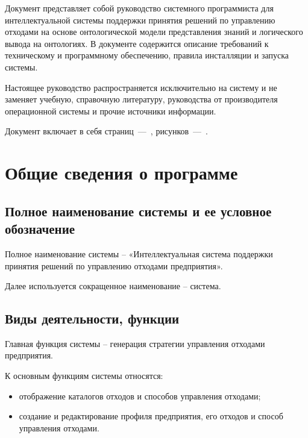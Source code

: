 \documentclass[a4paper]{G2-105}
\begin{document}
%
\VSTUInitializeRDSysProg
%


Документ представляет собой руководство системного программиста для интеллектуальной системы поддержки принятия решений по управлению отходами на основе онтологической модели представления знаний и логического вывода на онтологиях. В документе содержится описание требований к техническому и программному обеспечению, правила инсталляции и запуска системы.

Настоящее руководство распространяется исключительно на систему и не заменяет учебную, справочную литературу, руководства от производителя операционной системы и прочие источники информации.

Документ включает в себя страниц~---~\totalpages, рисунков~---~\totalfigures.

\CommonKeywords

\newpage

\tableofcontents

\newpage

\chapter{Общие сведения о программе}

\ttl

\section{Полное наименование системы и ее условное обозначение}

Полное наименование системы -- «Интеллектуальная система поддержки принятия решений по управлению отходами предприятия».

Далее используется сокращенное наименование -- система.

\section{Виды деятельности, функции}

Главная функция системы -- генерация стратегии управления отходами предприятия.

К основным функциям системы относятся:
\begin{itemize}
\item отображение каталогов отходов и способов управления отходами;
\item создание и редактирование профиля предприятия, его отходов и способ управления отходами.
\end{itemize}
\end{document}
